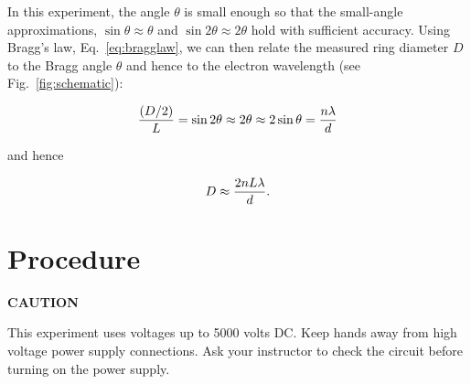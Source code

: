 \documentclass{tufte-handout}
\begin{document}
In this experiment, the angle ${\theta}$ is small enough so that the small-angle
approximations, $\sin\theta \approx \theta$ and $\sin2\theta \approx 2\theta$
hold with sufficient accuracy.  Using Bragg's law, Eq.~\ref{eq:bragglaw}, we can
then relate the measured ring diameter $D$ to the Bragg angle $\theta$ and hence
to the electron wavelength (see Fig.~\ref{fig:schematic}):
 
\begin{equation}
{ (D/2) \over L } = \sin2\theta \approx 2\theta \approx 2\sin\theta = \frac{n\lambda}{d}
\end{equation}

and hence

\begin{equation}
D \approx {2nL\lambda\over d}.
\end{equation}

\section{Procedure }

\begin{centering}
{\bf CAUTION}
\end{centering}

\noindent This experiment uses voltages up to 5000 volts DC.  Keep hands away
from high voltage power supply connections.  Ask your instructor to check the
circuit before turning on the power supply.
\end{document}
